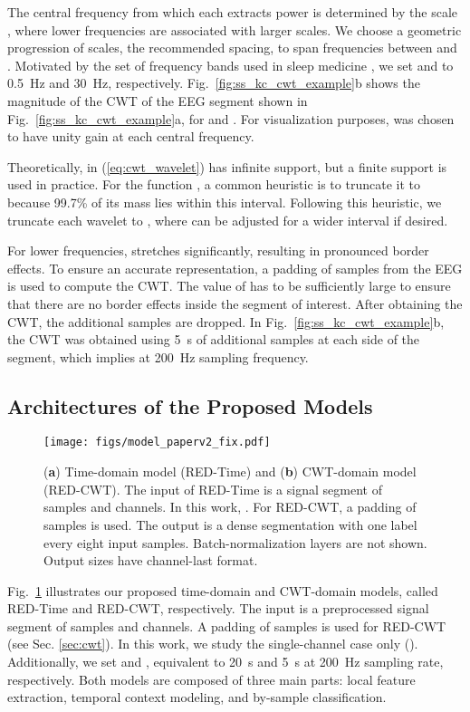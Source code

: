 \documentclass[conference]{IEEEtran}
\begin{document}
The central frequency from which each  extracts power is determined by the scale , where lower frequencies are associated with larger scales. We choose a geometric progression of scales, the recommended spacing, to span  frequencies between  and . Motivated by the set of frequency bands used in sleep medicine \cite{berry2012aasm}, we set  and  to 0.5~Hz and 30~Hz, respectively. Fig.~\ref{fig:ss_kc_cwt_example}b shows the magnitude of the CWT of the EEG segment shown in Fig.~\ref{fig:ss_kc_cwt_example}a, for  and . For visualization purposes,  was chosen to have unity gain at each central frequency.

Theoretically,  in (\ref{eq:cwt_wavelet}) has infinite support, but a finite support is used in practice. For the function , a common heuristic is to truncate it to  because 99.7\% of its mass lies within this interval. Following this heuristic, we truncate each wavelet to , where  can be adjusted for a wider interval if desired.

For lower frequencies,  stretches significantly, resulting in pronounced border effects. To ensure an accurate representation, a padding of  samples from the EEG is used to compute the CWT. The value of  has to be sufficiently large to ensure that there are no border effects inside the segment of interest. After obtaining the CWT, the additional samples are dropped. In Fig.~\ref{fig:ss_kc_cwt_example}b, the CWT was obtained using 5~s of additional samples at each side of the segment, which implies  at 200~Hz sampling frequency.


\subsection{Architectures of the Proposed Models}
\label{sec:models}

\begin{figure}[tbp]
\centering \texttt{[image: figs/model\_paperv2\_fix.pdf]}
\caption{(\textbf{a}) Time-domain model (RED-Time) and (\textbf{b}) CWT-domain model (RED-CWT). The input of RED-Time is a signal segment of  samples and  channels. In this work, . For RED-CWT, a padding of  samples is used. The output is a dense segmentation with one label every eight input samples. Batch-normalization layers are not shown. Output sizes have channel-last format.}
\label{fig:model}
\end{figure}

Fig.~\ref{fig:model} illustrates our proposed time-domain and CWT-domain models, called RED-Time and RED-CWT, respectively. The input is a preprocessed signal segment of  samples and  channels. A padding of  samples is used for RED-CWT (see Sec. \ref{sec:cwt}). In this work, we study the single-channel case only (). Additionally, we set  and , equivalent to 20~s and 5~s at 200~Hz sampling rate, respectively. Both models are composed of three main parts: local feature extraction, temporal context modeling, and by-sample classification.
\end{document}
